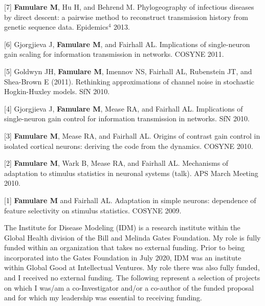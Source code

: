 \documentclass{article}
\begin{document}
\begin{llist}
\begin{items}
	\item[{[7]}] \textbf{Famulare M}, Hu H, and Behrend M. Phylogeography of infectious diseases by direct descent: a pairwise method to reconstruct transmission history from genetic sequence data. Epidemics$^4$ 2013. 
	  
	\item[{[6]}] Gjorgjieva J, \textbf{Famulare M}, and Fairhall AL.  Implications of single-neuron gain scaling for information transmission in networks.  COSYNE 2011.
	
	\item[{[5]}] Goldwyn JH, \textbf{Famulare M}, Imennov NS, Fairhall AL, Rubenstein JT, and Shea-Brown E (2011).  Rethinking approximations of channel noise in stochastic Hogkin-Huxley models.  SfN 2010.
	
	\item[{[4]}] Gjorgjieva J, \textbf{Famulare M}, Mease RA, and Fairhall AL.  Implications of single-neuron gain control for information transmission in networks.  SfN 2010.
	
	\item[{[3]}] \textbf{Famulare M}, Mease RA, and Fairhall AL.  Origins of contrast gain control in isolated cortical neurons: deriving the code from the dynamics. COSYNE 2010.
	
	\item[{[2]}] \textbf{Famulare M}, Wark B, Mease RA, and Fairhall AL.  Mechanisms of adaptation to stimulus statistics in neuronal systems (talk).  APS March Meeting 2010. 
	
	\item[{[1]}] \textbf{Famulare M} and Fairhall AL. Adaptation in simple neurons: dependence of feature selectivity on stimulus statistics. COSYNE 2009. \\

\end{items}

 \vspace{4pt}

The Institute for Disease Modeling (IDM) is a research institute within the Global Health division of the Bill and Melinda Gates Foundation. My role is fully funded within an organization that takes no external funding. Prior to being incorporated into the Gates Foundation in July 2020, IDM was an institute within Global Good at Intellectual Ventures. My role there was also fully funded, and I received no external funding. The following represent a selection of projects on which I was/am a co-Investigator and/or a co-author of the funded proposal and for which my leadership was essential to receiving funding.  


\end{llist}
\end{document}
